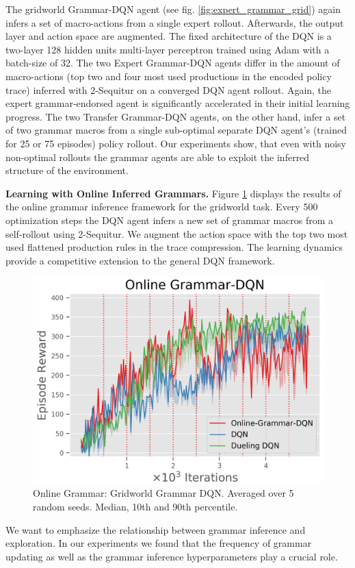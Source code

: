 \documentclass[10pt,letterpaper]{article}
\begin{document}
The gridworld Grammar-DQN agent (see fig. \ref{fig:expert_grammar_grid}) again infers a set of macro-actions from a single expert rollout. Afterwards, the output layer and action space are augmented. The fixed architecture of the DQN is a two-layer 128 hidden units multi-layer perceptron trained using Adam \cite{Kingma_2014} with a batch-size of 32.
The two Expert Grammar-DQN agents differ in the amount of macro-actions (top two and four most used productions in the encoded policy trace) inferred with 2-Sequitur on a converged DQN agent rollout. Again, the expert grammar-endorsed agent is significantly accelerated in their initial learning progress.
The two Transfer Grammar-DQN agents, on the other hand, infer a set of two grammar macros from a single sub-optimal separate DQN agent's (trained for 25 or 75 episodes) policy rollout. Our experiments show, that even with noisy non-optimal rollouts the grammar agents are able to exploit the inferred structure of the environment.

\textbf{Learning with Online Inferred Grammars.} Figure \ref{fig:online_grammar} displays the results of the online grammar inference framework for the gridworld task. Every 500 optimization steps the DQN agent infers a new set of grammar macros from a self-rollout using 2-Sequitur. We augment the action space with the top two most used flattened production rules in the trace compression. The learning dynamics provide a competitive extension to the general DQN framework.  

\begin{figure}[H]
\centering
  \includegraphics[width=0.65\linewidth]{figures/grammar_dqn_gridworld_online}
\caption{Online Grammar: Gridworld Grammar DQN. Averaged over 5 random seeds. Median, 10th and 90th percentile.}
\label{fig:online_grammar}
\end{figure}

We want to emphasize the relationship between grammar inference and exploration. In our experiments we found that the frequency of grammar updating as well as the grammar inference hyperparameters play a crucial role.
\end{document}

